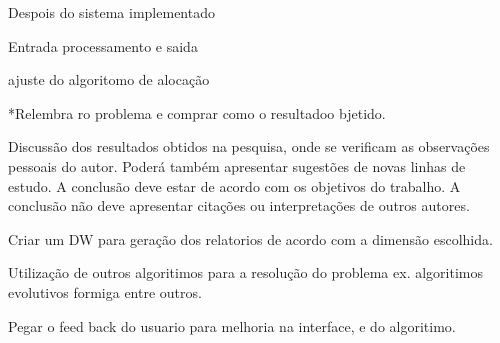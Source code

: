 	Despois do sistema implementado		

	Entrada processamento e saida

	ajuste do algoritomo de alocação


\iniciocapitulo

*Relembra ro problema e comprar como o resultadoo bjetido.

Discussão dos resultados obtidos na pesquisa, onde se verificam as observações pessoais do autor. Poderá também apresentar sugestões de novas linhas de estudo. A conclusão deve estar de acordo com os objetivos do trabalho. A conclusão não deve apresentar citações ou interpretações de outros autores.


Criar um DW para geração dos relatorios de acordo com a dimensão escolhida.

Utilização de outros algoritimos para a resolução do problema ex. algoritimos evolutivos formiga entre outros.

Pegar o feed back do usuario para melhoria na interface, e do algoritimo.